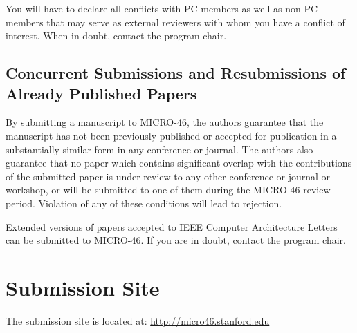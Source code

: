You will have to declare all conflicts with PC members as well as
non-PC members that may serve as external reviewers with whom you
have a conflict of interest. When in doubt, contact the program chair.


\subsection{Concurrent Submissions and Resubmissions of Already Published Papers}

By submitting a manuscript to MICRO-46, the authors guarantee that the
manuscript has not been previously published or accepted for
publication in a substantially similar form in any conference or
journal. The authors also guarantee that no paper which contains
significant overlap with the contributions of the submitted paper is
under review to any other conference or journal or workshop, or will
be submitted to one of them during the MICRO-46 review
period. Violation of any of these conditions will lead to rejection.

Extended versions of papers accepted to IEEE Computer Architecture
Letters can be submitted to MICRO-46.  If you are in doubt, contact
the program chair.

\section{Submission Site}

The submission site is located at:
\href{http://micro46.stanford.edu}{http://micro46.stanford.edu}

